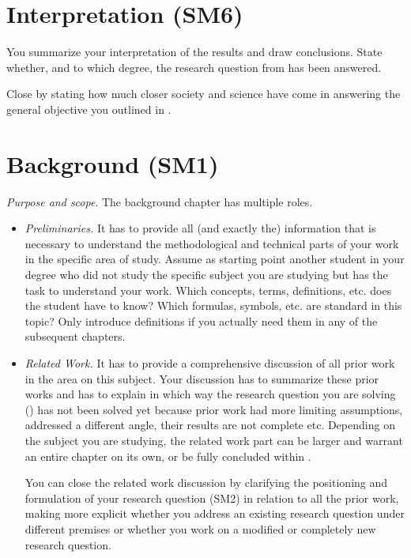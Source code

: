\section*{Interpretation (SM6)}

You summarize your interpretation of the results and draw conclusions.
State whether, and to which degree, the research question from  has been answered.

Close by stating how much closer society and science have come in answering the general objective you outlined in .

\section{Background (SM1)}\label{sec:background}

\emph{Purpose and scope}.
The background chapter has multiple roles.
\begin{itemize}

  \item \emph{Preliminaries.}
        It has to provide all (and exactly the) information that is necessary to understand the methodological and technical parts of your work in the specific area of study.
        Assume as starting point another student in your degree who did not study the specific subject you are studying but has the task to understand your work.
        Which concepts, terms, definitions, etc. does the student have to know?
        Which formulas, symbols, etc. are standard in this topic?
        Only introduce definitions if you actually need them in any of the subsequent chapters.

  \item \emph{Related Work.}
        It has to provide a comprehensive discussion of all prior work in the area on this subject.
        Your discussion has to summarize these prior works and has to explain in which way the research question you are solving () has not been solved yet because prior work had more limiting assumptions, addressed a different angle, their results are not complete etc. Depending on the subject you are studying, the related work part can be larger and warrant an entire chapter on its own, or be fully concluded within .

        You can close the related work discussion by clarifying the positioning and formulation of your research question (SM2) in relation to all the prior work, making more explicit whether you address an existing research question under different premises or whether you work on a modified or completely new research question.
\end{itemize}

